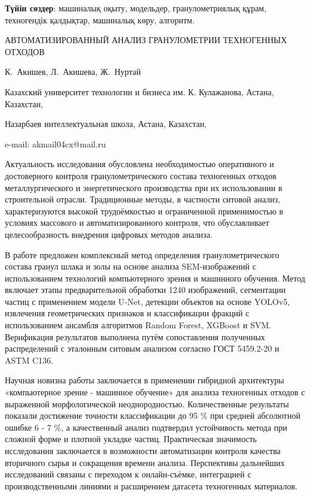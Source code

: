 {\bfseries Түйін сөздер}: машиналық оқыту, модельдер, гранулометриялық
құрам, техногендік қалдықтар, машиналық көру, алгоритм.

\begin{header}
АВТОМАТИЗИРОВАННЫЙ АНАЛИЗ ГРАНУЛОМЕТРИИ ТЕХНОГЕННЫХ ОТХОДОВ

К.~Акишев\envelope,
Л.~Акишева,
Ж.~Нуртай
\end{header}

\begin{affil}
Казахский университет технологии и бизнеса им. К. Кулажанова, Астана, Казахстан,

Назарбаев интеллектуальная школа, Астана, Казахстан,

e-mail: akmail04cx@mail.ru
\end{affil}

Актуальность исследования обусловлена необходимостью оперативного и
достоверного контроля гранулометрического состава техногенных отходов
металлургического и энергетического производства при их использовании в
строительной отрасли. Традиционные методы, в частности ситовой анализ,
характеризуются высокой трудоёмкостью и ограниченной применимостью в
условиях массового и автоматизированного контроля, что обуславливает
целесообразность внедрения цифровых методов анализа.

В работе предложен комплексный метод определения гранулометрического
состава гранул шлака и золы на основе анализа SEM-изображений с
использованием технологий компьютерного зрения и машинного обучения.
Метод включает этапы предварительной обработки 1240 изображений,
сегментации частиц с применением модели U-Net, детекции объектов на
основе YOLOv5, извлечения геометрических признаков и классификации
фракций с использованием ансамбля алгоритмов Random Forest, XGBoost и
SVM. Верификация результатов выполнена путём сопоставления полученных
распределений с эталонным ситовым анализом согласно ГОСТ 5459.2-20 и
ASTM C136.

Научная новизна работы заключается в применении гибридной архитектуры
«компьютерное зрение - машинное обучение» для анализа техногенных
отходов с выраженной морфологической неоднородностью. Количественные
результаты показали достижение точности классификации до 95 \% при
средней абсолютной ошибке 6 - 7 \%, а качественный анализ подтвердил
устойчивость метода при сложной форме и плотной укладке частиц.
Практическая значимость исследования заключается в возможности
автоматизации контроля качества вторичного сырья и сокращения времени
анализа. Перспективы дальнейших исследований связаны с переходом к
онлайн-съёмке, интеграцией с производственными линиями и расширением
датасета техногенных материалов.

